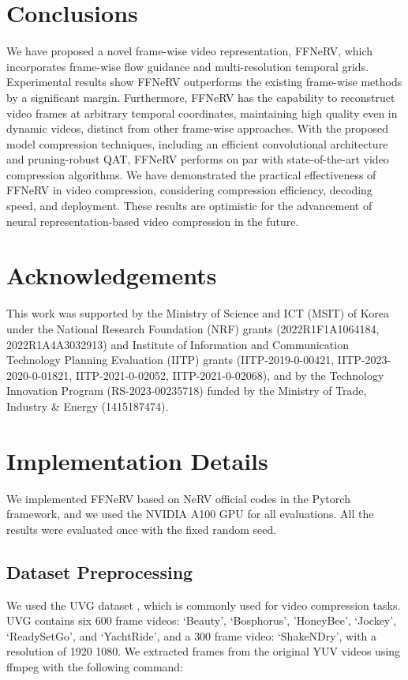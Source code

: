 \documentclass[sigconf]{acmart}
\begin{document}
\section{Conclusions}
We have proposed a novel frame-wise video representation, FFNeRV, which incorporates frame-wise flow guidance and multi-resolution temporal grids.
Experimental results show FFNeRV outperforms the existing frame-wise methods by a significant margin.
Furthermore, FFNeRV has the capability to reconstruct video frames at arbitrary temporal coordinates, maintaining high quality even in dynamic videos, distinct from other frame-wise approaches.
With the proposed model compression techniques, including an efficient convolutional architecture and pruning-robust QAT, FFNeRV performs on par with state-of-the-art video compression algorithms.
We have demonstrated the practical effectiveness of FFNeRV in video compression, considering compression efficiency, decoding speed, and deployment.
These results are optimistic for the advancement of neural representation-based video compression in the future.

\section*{Acknowledgements}
This work was supported by the Ministry of Science and ICT (MSIT) of Korea under the National Research Foundation (NRF) grants (2022R1F1A1064184, 2022R1A4A3032913) and Institute of Information and Communication Technology Planning Evaluation (IITP) grants (IITP-2019-0-00421, IITP-2023-2020-0-01821, IITP-2021-0-02052, IITP-2021-0-02068), and by the Technology Innovation Program (RS-2023-00235718) funded by the Ministry of Trade, Industry \& Energy (1415187474).




\balance



\appendix

\section{Implementation Details}
\label{app_imp}
We implemented FFNeRV based on NeRV \cite{nerv} official codes in the Pytorch framework, and we used the NVIDIA A100 GPU for all evaluations.
All the results were evaluated once with the fixed random seed.

\subsection{Dataset Preprocessing}
We used the UVG dataset \cite{uvg}, which is commonly used for video compression tasks.
UVG contains six 600 frame videos: `Beauty', `Bosphorus', 'HoneyBee', `Jockey', `ReadySetGo', and `YachtRide', and a 300 frame video: `ShakeNDry', with a resolution of 1920  1080.
We extracted frames from the original YUV videos using ffmpeg \cite{ffmpeg} with the following command:
\end{document}
